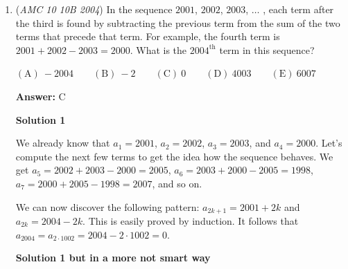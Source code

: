 \begin{enumerate}
 Therefore, we have $\frac{[EFD]}{[EAC]}=\frac{ED}{EC} \cdot \frac{EF}{EA} = \frac{12}{16} \cdot \frac{5}{20} = \frac{3}{16}.$

 Lastly, note that $\triangle{CDB}$ shares $\angle{C}$ with $\triangle{CAE}$.

 Therefore, we have $\frac{[CDB]}{[CAE]}=\frac{CD}{CE} \cdot \frac{CB}{CA} = \frac{9}{12} \cdot \frac{4}{16} = \frac{3}{16}.$

 Thus, the ratio of $\triangle{DBF}$ to $\triangle{ACE}$ is $1- \left( \frac{3}{16}+\frac{3}{16}+\frac{3}{16} \right)=1-\frac{9}{16}=\boxed{\textbf{(E)} \frac {7}{16}}$




\textbf{Solution 6 (Wooga Looga Theorem)}

We know that $\frac{CB}{BA}=\frac{AF}{FE}=\frac{ED}{DC}=3$, so by the \href{https://artofproblemsolving.com/wiki/index.php?title=The\_Devil\%27s\_Triangle}{The Devil's Triangle} we have $\frac{[DBF]}{[ACE]}=\frac{3^2-3+1}{(3+1)^2}=\boxed{\frac7{16}}$.

 


	\item (\textit{AMC 10 10B 2004}) In the sequence $2001$, $2002$, $2003$, $\ldots$ , each term after the third is found by subtracting the previous term from the sum of the two terms that precede that term. For example, the fourth term is $2001 + 2002 - 2003 = 2000$. What is the
$2004^\textrm{th}$ term in this sequence?


 $\mathrm{(A) \ } -2004 \qquad \mathrm{(B) \ } -2 \qquad \mathrm{(C) \ } 0 \qquad \mathrm{(D) \ } 4003 \qquad \mathrm{(E) \ } 6007$

 \textbf{Answer: }C



\textbf{Solution 1}

We already know that $a_1=2001$, $a_2=2002$, $a_3=2003$, and $a_4=2000$. Let's compute the next few terms to get the idea how the sequence behaves. We get $a_5 = 2002+2003-2000 = 2005$, $a_6=2003+2000-2005=1998$, $a_7=2000+2005-1998=2007$, and so on.

 We can now discover the following pattern: $a_{2k+1} = 2001+2k$ and $a_{2k}=2004-2k$. This is easily proved by induction. It follows that $a_{2004}=a_{2\cdot 1002} = 2004 - 2\cdot 1002 = \boxed{0}$.

 



\textbf{Solution 1 but in a more not smart way}


\end{enumerate}
